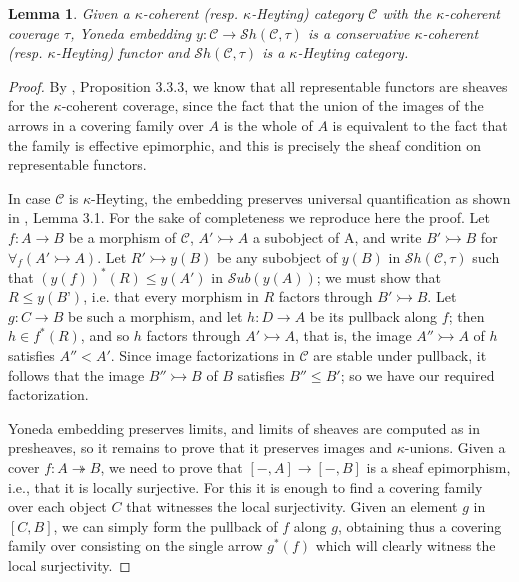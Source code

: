 \documentclass[a4paper,11pt]{article}
\theoremstyle{plain}
\newtheorem{lemma}[thm]{Lemma}
\theoremstyle{plain}
\theoremstyle{remark}
\begin{document}
\begin{lemma}\label{shemb}
 Given a $\kappa$-coherent (resp. $\kappa$-Heyting) category $\mathcal{C}$ with the $\kappa$-coherent coverage $\tau$, Yoneda embedding $y: \mathcal{C} \to \mathcal{S}h(\mathcal{C}, \tau)$ is a conservative $\kappa$-coherent (resp. $\kappa$-Heyting) functor and $\mathcal{S}h(\mathcal{C}, \tau)$ is a $\kappa$-Heyting category.
\end{lemma}

\begin{proof}
 By \cite{mr}, Proposition 3.3.3, we know that all representable functors are sheaves for the $\kappa$-coherent coverage, since the fact that the union of the images of the arrows in a covering family over $A$ is the whole of $A$ is equivalent to the fact that the family is effective epimorphic, and this is precisely the sheaf condition on representable functors. 
 
 In case $\mathcal{C}$ is $\kappa$-Heyting, the embedding preserves universal quantification as shown in \cite{bj}, Lemma 3.1. For the sake of completeness we reproduce here the proof. Let $f: A \to B$ be a morphism of $\mathcal{C}$, $A' \rightarrowtail A$ a subobject of A, and write $B' \rightarrowtail B$ for $\forall_f(A' \rightarrowtail A)$. Let $R' \rightarrowtail y(B)$ be any subobject of $y(B)$ in $\mathcal{S}h(\mathcal{C}, \tau)$ such that $(y(f))^*(R) \leq y(A')$ in $\mathcal{S}ub(y(A))$; we must show that $R \leq y(B’)$, i.e. that every morphism in $R$ factors through $B' \rightarrowtail B$. Let $g: C \to B$ be such a morphism, and let $h: D \to A$ be its pullback along $f$; then $h \in f^*(R)$, and so $h$ factors through $A' \rightarrowtail A$, that is, the image $A'' \rightarrowtail A$ of $h$ satisfies $A''<A'$. Since image factorizations in $\mathcal{C}$ are stable under pullback, it follows that the image $B'' \rightarrowtail B$ of $B$ satisfies $B'' \leq B'$; so we have our required factorization.
 
 Yoneda embedding preserves limits, and limits of sheaves are computed as in presheaves, so it remains to prove that it preserves images and $\kappa$-unions. Given a cover $f: A \twoheadrightarrow B$, we need to prove that $[-, A] \to [-, B]$ is a sheaf epimorphism, i.e., that it is locally surjective. For this it is enough to find a covering family over each object $C$ that witnesses the local surjectivity. Given an element $g$ in $[C, B]$, we can simply form the pullback of $f$ along $g$, obtaining thus a covering family over consisting on the single arrow $g^*(f)$ which will clearly witness the local surjectivity.
 

\end{proof}
\end{document}
